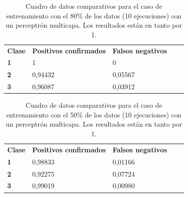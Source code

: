 \documentclass[10pt,a4paper]{article}
\begin{document}
\begin{table}[h!]
\centering
\begin{tabular}{|l|l|l|ll}
\cline{1-3}
\multicolumn{1}{|c|}{\textbf{Clase}} & \multicolumn{1}{c|}{\textbf{Positivos confirmados}} & \multicolumn{1}{c|}{\textbf{Falsos negativos}} & \multicolumn{1}{c}{\textbf{}} &  \\ \cline{1-3}
\textbf{1}                       &         1                       &       0                         &                               &  \\ \cline{1-3}
\textbf{2}                       &         0,94432 
&       0,05567 
&                               &  \\ \cline{1-3}
\textbf{3}                       &         0,96087                       &       0,03912                         &                               &  \\ \cline{1-3}
\end{tabular}
\caption{Cuadro de datos comparativos para el caso de entrenamiento con el 80\%{} de los datos (10 ejecuciones) con un perceptrón multicapa. Los resultados están en tanto por 1.}
\label{tab:ej5_80porcent}
\end{table}

\begin{table}[h!]
\centering
\begin{tabular}{|l|l|l|ll}
\cline{1-3}
\multicolumn{1}{|c|}{\textbf{Clase}} & \multicolumn{1}{c|}{\textbf{Positivos confirmados}} & \multicolumn{1}{c|}{\textbf{Falsos negativos}} & \multicolumn{1}{c}{\textbf{}} &  \\ \cline{1-3}
\textbf{1}                       &         0,98833                       &       0,01166                         &                               &  \\ \cline{1-3}
\textbf{2}                       &         0,92275 
&       0,07724 
&                               &  \\ \cline{1-3}
\textbf{3}                       &         0,99019                       &       0,00980                         &                               &  \\ \cline{1-3}
\end{tabular}
\caption{Cuadro de datos comparativos para el caso de entrenamiento con el 50\%{} de los datos (10 ejecuciones) con un perceptrón multicapa. Los resultados están en tanto por 1.}
\label{tab:ej5_50porcent}
\end{table}
\end{document}
